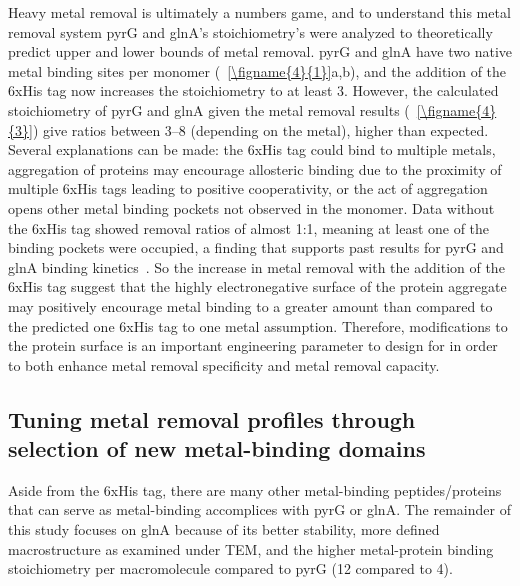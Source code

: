 \documentclass[../main/main]{subfiles}
\begin{document}
Heavy metal removal is ultimately a numbers game, and to understand this metal removal system pyrG and glnA's stoichiometry's were analyzed to theoretically predict upper and lower bounds of metal removal. pyrG and glnA have two native metal binding sites per monomer (\FIGURE~\ref{\figname{4}{1}}a,b), and the addition of the 6xHis tag now increases the stoichiometry to at least 3. However, the calculated stoichiometry of pyrG and glnA given the metal removal results (\FIGURE~\ref{\figname{4}{3}}) give ratios between 3--8 (depending on the metal), higher than expected. Several explanations can be made: the 6xHis tag could bind to multiple metals, aggregation of proteins may encourage allosteric binding due to the proximity of multiple 6xHis tags leading to positive cooperativity, or the act of aggregation opens other metal binding pockets not observed in the monomer. Data without the 6xHis tag showed removal ratios of almost 1:1, meaning at least one of the binding pockets were occupied, a finding that supports past results for pyrG and glnA binding kinetics~\cite{robertson1993,denton1969}. So the increase in metal removal with the addition of the 6xHis tag suggest that the highly electronegative surface of the protein aggregate may positively encourage metal binding to a greater amount than compared to the predicted one 6xHis tag to one metal assumption. Therefore, modifications to the protein surface is an important engineering parameter to design for in order to both enhance metal removal specificity and metal removal capacity.

\subsection{Tuning metal removal profiles through selection of new metal-binding domains}
Aside from the 6xHis tag, there are many other metal-binding peptides/proteins that can serve as metal-binding accomplices with pyrG or glnA. The remainder of this study focuses on glnA because of its better stability, more defined macrostructure as examined under TEM, and the higher metal-protein binding stoichiometry per macromolecule compared to pyrG (12 compared to 4).
\end{document}
